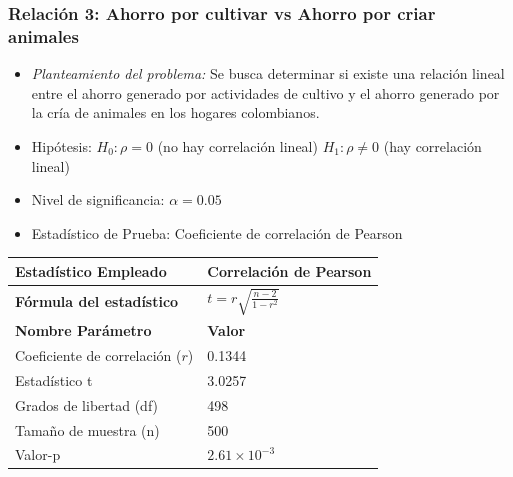 \documentclass[12pt,a4paper]{article}
\begin{document}
\subsubsection*{Relación 3: Ahorro por cultivar vs Ahorro por criar animales}

\begin{itemize}
    \item \textit{Planteamiento del problema:} Se busca determinar si existe una relación lineal entre el ahorro generado por actividades de cultivo y el ahorro generado por la cría de animales en los hogares colombianos.
    \item Hipótesis: \quad $H_0: \rho = 0$ (no hay correlación lineal) \hspace{1cm} $H_1: \rho \neq 0$ (hay correlación lineal)
    \item Nivel de significancia: $\alpha = 0.05$
    \item Estadístico de Prueba: Coeficiente de correlación de Pearson
\end{itemize}

\begin{tabular}{|m{7cm}|m{7cm}|}
\hline
\textbf{Estadístico Empleado} & Correlación de Pearson \\ \hline
\textbf{Fórmula del estadístico} & $t = r\sqrt{\frac{n-2}{1-r^2}}$ \\ \hline
\textbf{Nombre Parámetro} & \textbf{Valor} \\ \hline
Coeficiente de correlación ($r$) & 0.1344 \\ \hline
Estadístico t & 3.0257 \\ \hline
Grados de libertad (df) & 498 \\ \hline
Tamaño de muestra (n) & 500 \\ \hline
Valor-p & $2.61 \times 10^{-3}$ \\ \hline
\end{tabular}
\end{document}
